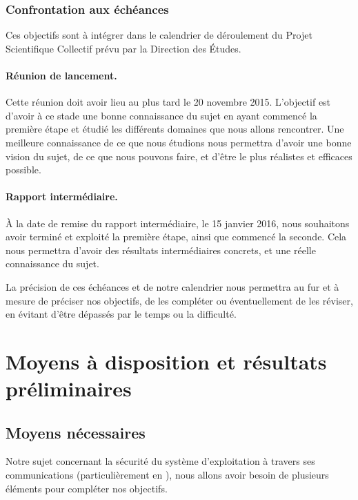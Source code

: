 \documentclass[a4paper, 12pt,twoside]{article}
\begin{document}
		\subsubsection{Confrontation aux échéances}
		
		Ces objectifs sont à intégrer dans le calendrier de déroulement du  Projet Scientifique Collectif prévu par la Direction des Études.
		
		\paragraph{Réunion de lancement. } Cette réunion doit avoir lieu au plus tard le 20 novembre 2015. L'objectif est d'avoir à ce stade une bonne connaissance du sujet en ayant commencé la première étape et étudié les différents domaines que nous allons rencontrer. Une meilleure connaissance de ce que nous étudions nous permettra d'avoir une bonne vision du sujet, de ce que nous pouvons faire, et d'être le plus réalistes et efficaces possible.
		
		\paragraph{Rapport intermédiaire. } À la date de remise du rapport intermédiaire, le 15 janvier 2016, nous souhaitons avoir terminé et exploité la première étape, ainsi que commencé la seconde. Cela nous permettra d'avoir des résultats intermédiaires concrets, et une réelle connaissance du sujet.
		
		La précision de ces échéances et de notre calendrier nous permettra au fur et à mesure de préciser nos objectifs, de les compléter ou éventuellement de les réviser, en évitant d'être dépassés par le temps ou la difficulté.
			
	\section{Moyens à disposition et résultats préliminaires}
	
		\subsection{Moyens nécessaires}

		Notre sujet concernant la sécurité du système d'exploitation \Android{} à travers ses communications (particulièrement en \wifi{}), nous allons avoir besoin de plusieurs éléments pour compléter nos objectifs.
		
\end{document}
